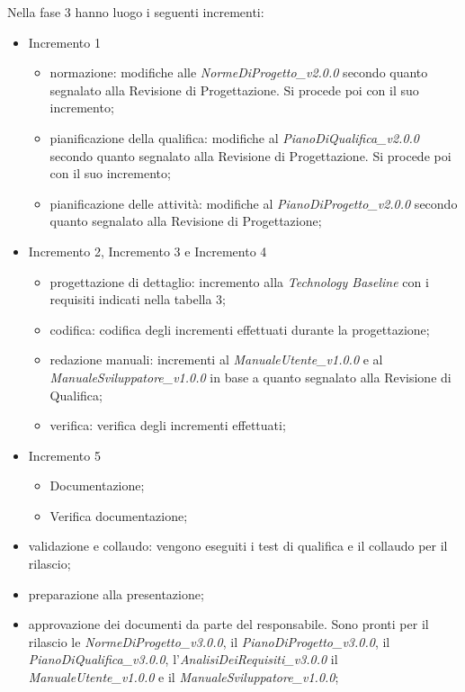 Nella fase 3 hanno luogo i seguenti incrementi:
\begin{itemize}
	\item Incremento 1
	\begin{itemize}
		\item normazione: modifiche alle \textit{NormeDiProgetto\_v2.0.0} secondo quanto segnalato alla Revisione di Progettazione. Si procede poi con il suo incremento;
		\item pianificazione della qualifica: modifiche al \textit{PianoDiQualifica\_v2.0.0} secondo quanto segnalato alla Revisione di Progettazione. Si procede poi con il suo incremento;
		\item pianificazione delle attività: modifiche al \textit{PianoDiProgetto\_v2.0.0} secondo quanto segnalato alla Revisione di Progettazione;
	\end{itemize}
	\item Incremento 2, Incremento 3 e Incremento 4
	\begin{itemize}
		\item progettazione di dettaglio: incremento alla \textit{Technology Baseline} con i requisiti indicati nella tabella 3;
		\item codifica: codifica degli incrementi effettuati durante la progettazione;
		\item redazione manuali: incrementi al \textit{ManualeUtente\_v1.0.0} e al \textit{ManualeSviluppatore\_v1.0.0} in base a quanto segnalato alla Revisione di Qualifica;
		\item verifica: verifica degli incrementi effettuati;
	\end{itemize}
	\item Incremento 5
	\begin{itemize}
		\item Documentazione;
		\item Verifica documentazione;
	\end{itemize}
	\item validazione e collaudo: vengono eseguiti i test di qualifica e il collaudo per il rilascio;
	\item preparazione alla presentazione;
	\item approvazione dei documenti da parte del responsabile. Sono pronti per il rilascio le \textit{NormeDiProgetto\_v3.0.0}, il \textit{PianoDiProgetto\_v3.0.0}, il \textit{PianoDiQualifica\_v3.0.0}, l'\textit{AnalisiDeiRequisiti\_v3.0.0} il
	\textit{ManualeUtente\_v1.0.0} e il \textit{ManualeSviluppatore\_v1.0.0};
\end{itemize}

